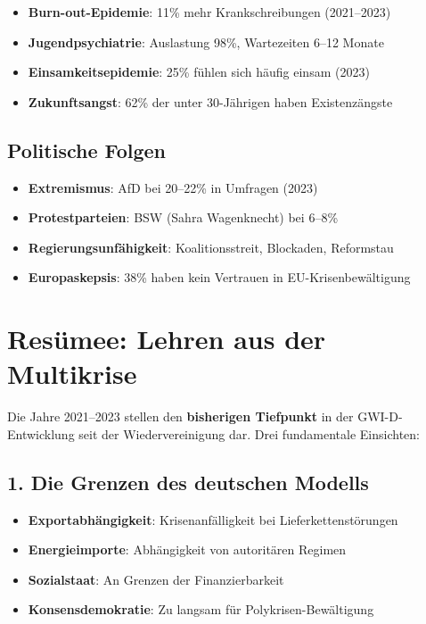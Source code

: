 \begin{itemize}
    \item \textbf{Burn-out-Epidemie}: 11\% mehr Krankschreibungen (2021–2023)
    \item \textbf{Jugendpsychiatrie}: Auslastung 98\%, Wartezeiten 6–12 Monate
    \item \textbf{Einsamkeitsepidemie}: 25\% fühlen sich häufig einsam (2023)
    \item \textbf{Zukunftsangst}: 62\% der unter 30-Jährigen haben Existenzängste
\end{itemize}

\subsection{Politische Folgen}

\begin{itemize}
    \item \textbf{Extremismus}: AfD bei 20–22\% in Umfragen (2023)
    \item \textbf{Protestparteien}: BSW (Sahra Wagenknecht) bei 6–8\%
    \item \textbf{Regierungsunfähigkeit}: Koalitionsstreit, Blockaden, Reformstau
    \item \textbf{Europaskepsis}: 38\% haben kein Vertrauen in EU-Krisenbewältigung
\end{itemize}

\section{Resümee: Lehren aus der Multikrise}

Die Jahre 2021–2023 stellen den \textbf{bisherigen Tiefpunkt} in der GWI-D-Entwicklung seit der Wiedervereinigung dar. Drei fundamentale Einsichten:

\subsection{1. Die Grenzen des deutschen Modells}

\begin{itemize}
    \item \textbf{Exportabhängigkeit}: Krisenanfälligkeit bei Lieferkettenstörungen
    \item \textbf{Energieimporte}: Abhängigkeit von autoritären Regimen
    \item \textbf{Sozialstaat}: An Grenzen der Finanzierbarkeit
    \item \textbf{Konsensdemokratie}: Zu langsam für Polykrisen-Bewältigung
\end{itemize}

